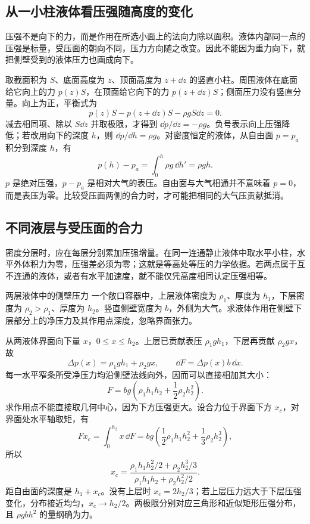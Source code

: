 \subsection{从一小柱液体看压强随高度的变化}
压强不是向下的力，而是作用在所选小面上的法向力除以面积。液体内部同一点的压强是标量，受压面的朝向不同，压力方向随之改变。因此不能因为重力向下，就把侧壁受到的液体压力也画成向下。

取截面积为 $S$、底面高度为 $z$、顶面高度为 $z+\dd z$ 的竖直小柱。周围液体在底面给它向上的力 $p(z)S$，在顶面给它向下的力 $p(z+\dd z)S$；侧面压力没有竖直分量。向上为正，平衡式为
\[
 p(z)S-p(z+\dd z)S-\rho gS\dd z=0.
\]
减去相同项、除以 $S\dd z$ 并取极限，才得到 $\dd p/\dd z=-\rho g$。负号表示向上压强降低；若改用向下的深度 $h$，则 $\dd p/\dd h=\rho g$。对密度恒定的液体，从自由面 $p=p_a$ 积分到深度 $h$，有
\[
 p(h)-p_a=\int_0^h\rho g\,\dd h'=\rho gh.
\]
$p$ 是绝对压强，$p-p_a$ 是相对大气的表压。自由面与大气相通并不意味着 $p=0$，而是表压为零。比较受压面两侧的合力时，才可能把相同的大气压贡献抵消。

\subsection{不同液层与受压面的合力}
密度分层时，应在每层分别累加压强增量。在同一连通静止液体中取水平小柱，水平外体积力为零，压强差必须为零；这就是等高处等压的力学依据。若两点属于互不连通的液体，或者有水平加速度，就不能仅凭高度相同认定压强相等。

\begin{origexamplebox}{两层液体中的侧壁压力}\label{ch13:ex:teaching-layered}
一个敞口容器中，上层液体密度为 $\rho_1$、厚度为 $h_1$，下层密度为 $\rho_2>\rho_1$、厚度为 $h_2$。竖直侧壁宽度为 $b$，外侧为大气。求液体作用在侧壁下层部分上的净压力及其作用点深度，忽略界面张力。
\end{origexamplebox}
\begin{xesolution}
从两液体界面向下量 $x$，$0\le x\le h_2$。上层已贡献表压 $\rho_1gh_1$，下层再贡献 $\rho_2gx$，故
\[
 \Delta p(x)=\rho_1gh_1+\rho_2gx,
 \qquad \dd F=\Delta p(x)b\,\dd x.
\]
每一水平窄条所受净压力均沿侧壁法线向外，因而可以直接相加其大小：
\[
 F=bg\left(\rho_1h_1h_2+\frac12\rho_2h_2^2\right).
\]
求作用点不能直接取几何中心，因为下方压强更大。设合力位于界面下方 $x_c$，对界面处水平轴取矩，有
\[
 Fx_c=\int_0^{h_2}x\,\dd F
 =bg\left(\frac12\rho_1h_1h_2^2+\frac13\rho_2h_2^3\right),
\]
所以
\[
 x_c=\frac{\rho_1h_1h_2^2/2+\rho_2h_2^3/3}
 {\rho_1h_1h_2+\rho_2h_2^2/2}.
\]
距自由面的深度是 $h_1+x_c$。没有上层时 $x_c=2h_2/3$；若上层压力远大于下层压强变化，分布接近均匀，$x_c\to h_2/2$。两极限分别对应三角形和近似矩形压强分布，且 $\rho gbh^2$ 的量纲确为力。
\end{xesolution}

